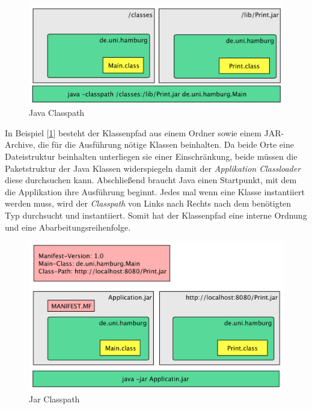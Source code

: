   \begin{figure}[h]
    \includegraphics[width=\textwidth]{material/images/Classpath.png}
    \caption{Java Classpath}
    \label{fig:Classpath-Simple}
  \end{figure}

  In Beispiel [\ref{fig:Classpath-Simple}] besteht der Klassenpfad aus einem Ordner sowie einem JAR-Archive, die für die Ausführung nötige Klassen beinhalten. 
  Da beide Orte eine Dateistruktur beinhalten unterliegen sie einer Einschränkung, beide müssen die Paketstruktur der Java Klassen widerspiegeln damit der \textit{Applikation Classloader} diese durchsuchen kann. 
  Abschließend braucht Java einen Startpunkt, mit dem die Applikation ihre Ausführung beginnt. 
  Jedes mal wenn eine Klasse instantiiert werden muss, wird der \textit{Classpath} von Links nach Rechts nach dem benötigten Typ durchsucht und instantiiert. 
  Somit hat der Klassenpfad eine interne Ordnung und eine Abarbeitungsreihenfolge.
  \begin{figure}[h]
    \includegraphics[width=\textwidth]{material/images/Classpath-Manifest.png}
    \caption{Jar Classpath}
    \label{fig:Classpath-Advanced}
  \end{figure}

